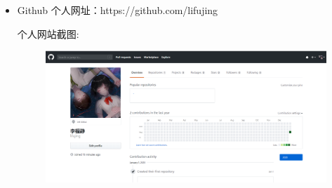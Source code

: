 \documentclass{article}
\begin{document}
\par
\begin{itemize}
    \item   Github 个人网址：https://github.com/lifujing \par
    个人网站截图:\par
   \begin{figure}[h!]
   	\centering
   	\includegraphics[scale=0.2]{x}
   	\caption{}
   	\label{fig:x}
   \end{figure}


\end{itemize}
\end{document}
